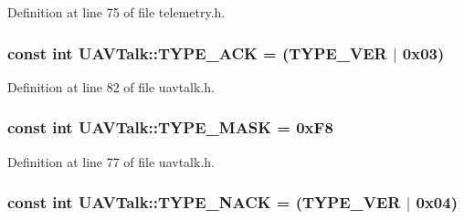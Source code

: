 \-Definition at line 75 of file telemetry.\-h.

\hypertarget{group___u_a_v_talk_plugin_gaec2c5c58b05deb71a40e1248ff82aa52}{
\subsubsection[{\-T\-Y\-P\-E\-\_\-\-A\-C\-K}]{\setlength{\rightskip}{0pt plus 5cm}const int {\bf \-U\-A\-V\-Talk\-::\-T\-Y\-P\-E\-\_\-\-A\-C\-K} = (\-T\-Y\-P\-E\-\_\-\-V\-E\-R $|$ 0x03)}}\label{group___u_a_v_talk_plugin_gaec2c5c58b05deb71a40e1248ff82aa52}


\-Definition at line 82 of file uavtalk.\-h.

\hypertarget{group___u_a_v_talk_plugin_gadad9ea7937a0ef8cf1a162fc2265e9c4}{
\subsubsection[{\-T\-Y\-P\-E\-\_\-\-M\-A\-S\-K}]{\setlength{\rightskip}{0pt plus 5cm}const int {\bf \-U\-A\-V\-Talk\-::\-T\-Y\-P\-E\-\_\-\-M\-A\-S\-K} = 0x\-F8}}\label{group___u_a_v_talk_plugin_gadad9ea7937a0ef8cf1a162fc2265e9c4}


\-Definition at line 77 of file uavtalk.\-h.

\hypertarget{group___u_a_v_talk_plugin_ga809ec3528886e43e38072e2d16787668}{
\subsubsection[{\-T\-Y\-P\-E\-\_\-\-N\-A\-C\-K}]{\setlength{\rightskip}{0pt plus 5cm}const int {\bf \-U\-A\-V\-Talk\-::\-T\-Y\-P\-E\-\_\-\-N\-A\-C\-K} = (\-T\-Y\-P\-E\-\_\-\-V\-E\-R $|$ 0x04)}}\label{group___u_a_v_talk_plugin_ga809ec3528886e43e38072e2d16787668}


